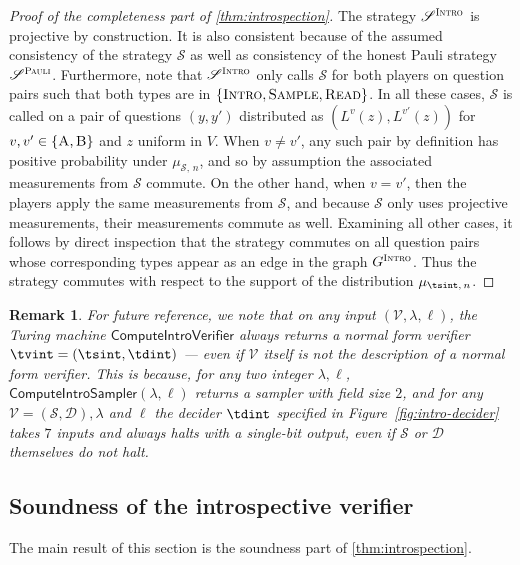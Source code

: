 \documentclass[11pt]{article}
\newtheorem{remark}[theorem]{Remark}
\theoremstyle{definition}
\newcommand{\sampler}{\mathcal{S}}
\newcommand{\decider}{\mathcal{D}}
\newcommand{\verifier}{\mathcal{V}}
\newcommand{\strategy}{\mathscr{S}}
\newcommand{\gamestyle}[1]{\ensuremath{\textsc{#1}}\xspace}
\newcommand{\pauli}{\gamestyle{Pauli}}
\newcommand{\intro}{\gamestyle{Intro}}
\newcommand{\labelstyle}[1]{\ensuremath{\textsc{#1}}\xspace}
\newcommand{\trole}{\ensuremath{v}}
\newcommand{\alice}{\labelstyle{A}}
\newcommand{\bob}{\labelstyle{B}}
\newcommand{\typestyle}[1]{\ensuremath{\textsc{#1}}\xspace}
\newcommand{\Sample}{\typestyle{Sample}}
\newcommand{\Read}{\typestyle{Read}}
\newcommand{\Introspect}{\typestyle{Intro}}
\newcommand{\tmstyle}[1]{\ensuremath{\mathsf{#1}}}
\newcommand{\ComputeIntroSampler}{\tmstyle{ComputeIntroSampler}}
\newcommand{\ComputeIntroVerifier}{\tmstyle{ComputeIntroVerifier}}
\begin{document}
\begin{proof}[Proof of the completeness part of \cref{thm:introspection}]
The strategy $\strategy^\intro$ is projective by construction.
It is also consistent because of the assumed consistency of the strategy
$\strategy$ as well as consistency of the honest Pauli strategy $\strategy^\pauli$.
Furthermore, note that $\strategy^\intro$ only calls $\strategy$ for both
players on question pairs such that both types are in
$\{\Introspect,\Sample,\Read\}$.
In all these cases, $\strategy$ is called on a pair of questions $(y,y')$
distributed as $(L^\trole(z),L^{\trole'}(z))$ for
$\trole,\trole'\in\{\alice,\bob\}$ and $z$ uniform in $V$.
When $v \neq v'$, any such pair by definition has positive probability under
$\mu_{\sampler,\, n}$, and so by assumption the associated measurements from
$\strategy$ commute.
On the other hand, when $v = v'$, then the players apply the same measurements
from $\strategy$, and because $\strategy$ only uses projective measurements,
their measurements commute as well.
Examining all other cases, it follows by direct inspection that the strategy
commutes on all question pairs whose corresponding types appear as an edge in
the graph $G^\intro$.
Thus the strategy commutes with respect to the support of the distribution
$\mu_{\tsint,\, n}$.
\end{proof}

\begin{remark}\label{rk:intro-normalform}
  For future reference, we note that on any input $(\verifier, \lambda, \ell)$,
the Turing machine $\ComputeIntroVerifier$ \emph{always} returns a normal form verifier $\tvint =
  (\tsint,\tdint)$ --- even if $\verifier$ itself is not the description of a normal form verifier. 
  This is because, for any two integer $\lambda,\ell$,
  $\ComputeIntroSampler(\lambda,\ell)$ returns a sampler with field size $2$,
  and for any $\verifier = (\sampler,\decider), \lambda$ and $\ell$ the decider $\tdint$ specified in
  Figure~\ref{fig:intro-decider} takes $7$ inputs and always halts with a
  single-bit output, even if $\sampler$ or $\decider$ themselves do not halt.
\end{remark}

\subsection{Soundness of the introspective verifier}
\label{sec:intro-soundness}

The main result of this section is the soundness part of
\cref{thm:introspection}.
\end{document}
